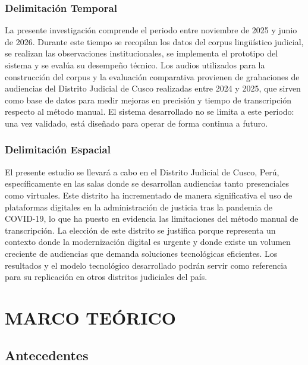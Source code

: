 \documentclass[12pt,a4paper,oneside]{report}
\begin{document}
\subsection{Delimitación Temporal}

La presente investigación comprende el periodo entre noviembre de 2025 y junio de 2026. Durante este tiempo se recopilan los datos del corpus lingüístico judicial, se realizan las observaciones institucionales, se implementa el prototipo del sistema y se evalúa su desempeño técnico. Los audios utilizados para la construcción del corpus y la evaluación comparativa provienen de grabaciones de audiencias del Distrito Judicial de Cusco realizadas entre 2024 y 2025, que sirven como base de datos para medir mejoras en precisión y tiempo de transcripción respecto al método manual. El sistema desarrollado no se limita a este periodo: una vez validado, está diseñado para operar de forma continua a futuro.

\subsection{Delimitación Espacial}

El presente estudio se llevará a cabo en el Distrito Judicial de Cusco, Perú, específicamente en las salas donde se desarrollan audiencias tanto presenciales como virtuales. Este distrito ha incrementado de manera significativa el uso de plataformas digitales en la administración de justicia tras la pandemia de COVID-19, lo que ha puesto en evidencia las limitaciones del método manual de transcripción. La elección de este distrito se justifica porque representa un contexto donde la modernización digital es urgente y donde existe un volumen creciente de audiencias que demanda soluciones tecnológicas eficientes. Los resultados y el modelo tecnológico desarrollado podrán servir como referencia para su replicación en otros distritos judiciales del país.

\chapter{MARCO TEÓRICO}

\section{Antecedentes}
\end{document}
